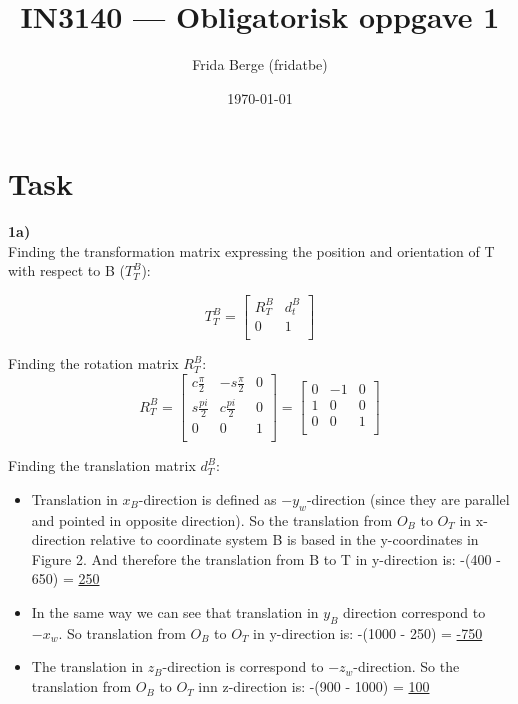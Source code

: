 \documentclass[12pt,norsk,a4paper]{article}
\author{Frida Berge (fridatbe)}
\title{IN3140 --- Obligatorisk oppgave 1}
\date{\today}
\begin{document}
    \maketitle
    \renewcommand{\thesubsection}{(\alph{subsection})}
    \newpage

    \section{Task}
    \textbf{1a)}\\
    Finding the transformation matrix expressing the position and orientation of T with respect to B ($T_T^{B}$):
    
        \[T_T^{B} = 
            \left[ \begin{array}{cc}
                R_T^B & d_t^B \\
                0 & 1\\
            \end{array} \right]\]

        Finding the rotation matrix $R_T^B$:
        \[R_T^{B} = \left[ \begin{array}{ccc}
            c\frac{\pi}{2} & -s\frac{\pi}{2} & 0 \\
            s\frac{pi}{2} & c\frac{pi}{2} & 0 \\
            0 & 0 & 1 \\
        \end{array} \right]
        =\left[ \begin{array}{ccc}
            0 & -1 & 0 \\
            1 & 0 & 0 \\
            0 & 0 & 1 \\
        \end{array} \right]\]

        Finding the translation matrix $d_T^B$:
        \begin{itemize}
            \item Translation in $x_B$-direction is defined as $-y_w$-direction (since they are parallel and pointed in opposite direction). 
            So the translation from $O_B$ to $O_T$ in x-direction relative to coordinate system B 
            is based in the y-coordinates in Figure 2.
            And therefore the translation from B to T in y-direction is: -(400 - 650) = \underline{250}
            \item In the same way we can see that translation in $y_B$ direction correspond to $-x_w$.
            So translation from $O_B$ to $O_T$ in y-direction is: -(1000 - 250) = \underline{-750}
            \item The translation in $z_B$-direction is correspond to $-z_w$-direction.
            So the translation from $O_B$ to $O_T$ inn z-direction is: -(900 - 1000) = \underline{100}
        \end{itemize}
\end{document}
